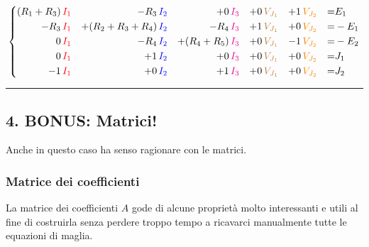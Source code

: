 \begin{equation}
    \left\{
    \begin{aligned}
        (R_1 + R_3)\, & \textcolor{red}{I_1} & - R_3\,               & \textcolor{blue}{I_2} & + 0\,           & \textcolor{magenta}{I_3} & + 0\, & \textcolor{brown}{V_{J_1}} & + 1\, & \textcolor{orange}{V_{J_2}} & = & E_1   \\
        -R_3\,         & \textcolor{red}{I_1} & + (R_2 + R_3 + R_4)\, & \textcolor{blue}{I_2} & - R_4\,         & \textcolor{magenta}{I_3} & + 1\, & \textcolor{brown}{V_{J_1}} & + 0\, & \textcolor{orange}{V_{J_2}} & = & - E_1 \\
        0\,           & \textcolor{red}{I_1} & - R_4\,               & \textcolor{blue}{I_2} & + (R_4 + R_5)\, & \textcolor{magenta}{I_3} & + 0\, & \textcolor{brown}{V_{J_1}} & - 1\, & \textcolor{orange}{V_{J_2}} & = & - E_2 \\
        0\,           & \textcolor{red}{I_1} & + 1\,                 & \textcolor{blue}{I_2} & + 0\,           & \textcolor{magenta}{I_3} & + 0\, & \textcolor{brown}{V_{J_1}} & + 0\, & \textcolor{orange}{V_{J_2}} & = & J_1   \\
        - 1\,         & \textcolor{red}{I_1} & + 0\,                 & \textcolor{blue}{I_2} & + 1\,           & \textcolor{magenta}{I_3} & + 0\, & \textcolor{brown}{V_{J_1}} & + 0\, & \textcolor{orange}{V_{J_2}} & = & J_2
    \end{aligned}
    \right.
\end{equation}


\hrule
\subsection*{4. BONUS: Matrici!}

Anche in questo caso ha senso ragionare con le matrici.

\subsubsection*{Matrice dei coefficienti}

La matrice dei coefficienti $A$ gode di alcune proprietà molto interessanti e utili al fine di costruirla senza perdere troppo tempo a ricavarci manualmente tutte le equazioni di maglia.

